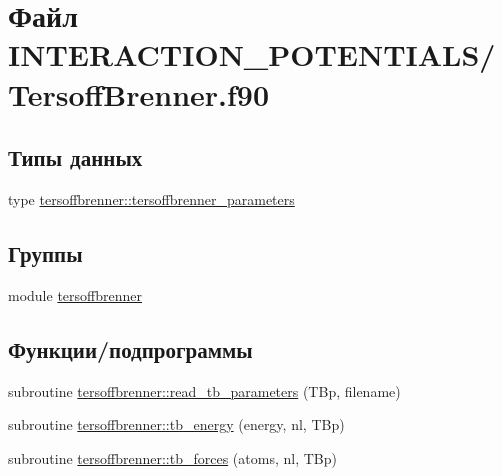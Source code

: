 \hypertarget{_tersoff_brenner_8f90}{}\section{Файл I\+N\+T\+E\+R\+A\+C\+T\+I\+O\+N\+\_\+\+P\+O\+T\+E\+N\+T\+I\+A\+L\+S/\+Tersoff\+Brenner.f90}
\label{_tersoff_brenner_8f90}
\subsection*{Типы данных}
\begin{DoxyCompactItemize}
\item 
type \mbox{\hyperlink{structtersoffbrenner_1_1tersoffbrenner__parameters}{tersoffbrenner\+::tersoffbrenner\+\_\+parameters}}
\end{DoxyCompactItemize}
\subsection*{Группы}
\begin{DoxyCompactItemize}
\item 
module \mbox{\hyperlink{namespacetersoffbrenner}{tersoffbrenner}}
\end{DoxyCompactItemize}
\subsection*{Функции/подпрограммы}
\begin{DoxyCompactItemize}
\item 
subroutine \mbox{\hyperlink{namespacetersoffbrenner_a04beb5c27e136d95b3502f15d39d8ef9}{tersoffbrenner\+::read\+\_\+tb\+\_\+parameters}} (T\+Bp, filename)
\item 
subroutine \mbox{\hyperlink{namespacetersoffbrenner_a273a6849892363697886b1f1d0f8df93}{tersoffbrenner\+::tb\+\_\+energy}} (energy, nl, T\+Bp)
\item 
subroutine \mbox{\hyperlink{namespacetersoffbrenner_a1edc8ac251b3fa58026839db4d23f12a}{tersoffbrenner\+::tb\+\_\+forces}} (atoms, nl, T\+Bp)
\end{DoxyCompactItemize}
